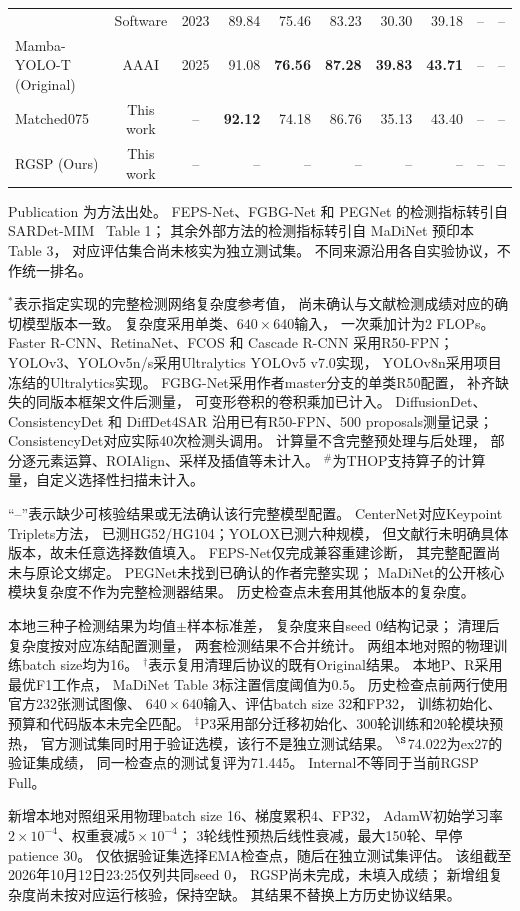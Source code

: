\begin{table}[!t]
\begin{tabular*}{\textwidth}{@{\extracolsep{\fill}}lccrrrrrrr}
& Software & 2023
& 89.84 & 75.46 & 83.23 & 30.30 & 39.18
& -- & -- \\
Mamba-YOLO-T (Original)~\cite{mambayolo2024}
& AAAI & 2025
& 91.08 & \textbf{76.56} & \textbf{87.28} & \textbf{39.83} & \textbf{43.71}
& -- & -- \\
Matched075
& This work & --
& \textbf{92.12} & 74.18 & 86.76 & 35.13 & 43.40
& -- & -- \\
RGSP (Ours)
& This work & --
& -- & -- & -- & -- & --
& -- & -- \\
\bottomrule
\end{tabular*}
\smallskip
\begin{minipage}{\linewidth}
\footnotesize
Publication 为方法出处。
FEPS-Net、FGBG-Net 和 PEGNet 的检测指标转引自
SARDet-MIM~\cite{sardetmim2026} Table 1；
其余外部方法的检测指标转引自
MaDiNet 预印本~\cite{madinet_preprint} Table 3，
对应评估集合尚未核实为独立测试集。
不同来源沿用各自实验协议，不作统一排名。

$^{*}$表示指定实现的完整检测网络复杂度参考值，
尚未确认与文献检测成绩对应的确切模型版本一致。
复杂度采用单类、$640\times640$输入，
一次乘加计为2 FLOPs。
Faster R-CNN、RetinaNet、FCOS 和 Cascade R-CNN 采用R50-FPN；
YOLOv3、YOLOv5n/s采用Ultralytics YOLOv5 v7.0实现，
YOLOv8n采用项目冻结的Ultralytics实现。
FGBG-Net采用作者master分支的单类R50配置，
补齐缺失的同版本框架文件后测量，
可变形卷积的卷积乘加已计入。
DiffusionDet、ConsistencyDet 和 DiffDet4SAR
沿用已有R50-FPN、500 proposals测量记录；
ConsistencyDet对应实际40次检测头调用。
计算量不含完整预处理与后处理，
部分逐元素运算、ROIAlign、采样及插值等未计入。
$^{\#}$为THOP支持算子的计算量，自定义选择性扫描未计入。

“--”表示缺少可核验结果或无法确认该行完整模型配置。
CenterNet对应Keypoint Triplets方法，
已测HG52/HG104；YOLOX已测六种规模，
但文献行未明确具体版本，故未任意选择数值填入。
FEPS-Net仅完成兼容重建诊断，
其完整配置尚未与原论文绑定。
PEGNet未找到已确认的作者完整实现；
MaDiNet的公开核心模块复杂度不作为完整检测器结果。
历史检查点未套用其他版本的复杂度。

本地三种子检测结果为均值$\pm$样本标准差，
复杂度来自seed 0结构记录；
清理后复杂度按对应冻结配置测量，
两套检测结果不合并统计。
两组本地对照的物理训练batch size均为16。
$^{\dagger}$表示复用清理后协议的既有Original结果。
本地P、R采用最优F1工作点，
MaDiNet Table 3标注置信度阈值为0.5。
历史检查点前两行使用官方232张测试图像、
$640\times640$输入、评估batch size 32和FP32，
训练初始化、预算和代码版本未完全匹配。
$^{\ddagger}$P3采用部分迁移初始化、300轮训练和20轮模块预热，
官方测试集同时用于验证选模，该行不是独立测试结果。
$^{\S}$74.022为ex27的验证集成绩，
同一检查点的测试复评为71.445。
Internal不等同于当前RGSP Full。

新增本地对照组采用物理batch size 16、梯度累积4、FP32，
AdamW初始学习率$2\times10^{-4}$、权重衰减$5\times10^{-4}$；
3轮线性预热后线性衰减，最大150轮、早停patience 30。
仅依据验证集选择EMA检查点，随后在独立测试集评估。
该组截至2026年10月12日23:25仅列共同seed 0，
RGSP尚未完成，未填入成绩；
新增组复杂度尚未按对应运行核验，保持空缺。
其结果不替换上方历史协议结果。
\end{minipage}
\end{table}

